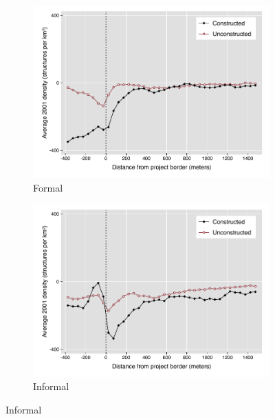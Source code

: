 \documentclass[12pt]{article}
\begin{document}
\begin{figure}
\caption{All Projects}
        \begin{subfigure}[b]{0.495\textwidth}
            \centering
        \caption{Formal}
            \includegraphics[width=\textwidth,trim={0.3cm .3cm 0.1cm 0cm}, clip=true]{figures/bblu_for_pre_means_4}
        \end{subfigure}
        \hfill
        \begin{subfigure}[b]{0.495\textwidth}  
            \centering 
        \caption{ Informal}
            \includegraphics[width=\textwidth,trim={0.3cm .3cm 0.1cm 0cm}, clip=true]{figures/bblu_inf_pre_means_4.pdf}
        \end{subfigure}

\end{figure}
\end{document}
